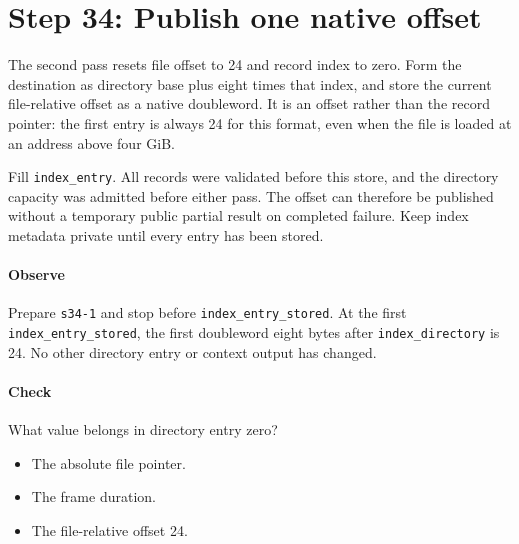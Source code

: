 \section{Step 34: Publish one native offset}
The second pass resets file offset to 24 and record index to zero. Form
the destination as directory base plus eight times that index, and store the
current file-relative offset as a native doubleword. It is an offset rather
than the record pointer: the first entry is always 24 for this format, even
when the file is loaded at an address above four GiB.

Fill \texttt{index\_entry}. All records were validated before this store,
and the directory capacity was admitted before either pass. The offset can
therefore be published without a temporary public partial result on completed
failure. Keep index metadata private until every entry has been stored.

\paragraph{Observe} Prepare \texttt{s34-1} and stop before
\texttt{index\_entry\_stored}. At the first \texttt{index\_entry\_stored}, the first
doubleword eight bytes after \texttt{index\_directory} is 24. No other
directory entry or context output has changed.

\paragraph{Check} What value belongs in directory entry zero?
\begin{itemize}
  \item[A.] The absolute file pointer.
  \item[B.] The frame duration.
  \item[C.] The file-relative offset 24.
\end{itemize}

